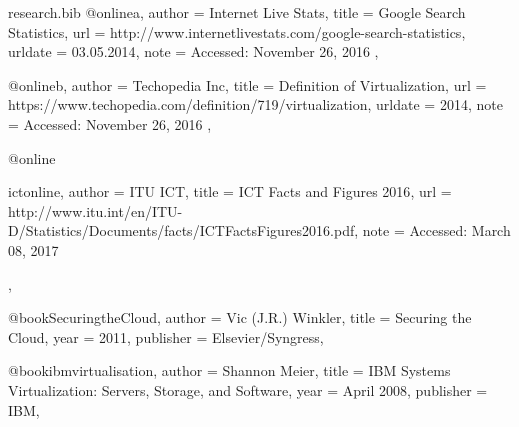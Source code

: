 \documentclass{article}
\begin{document}
	\begin{filecontents*}{research.bib}
		@online{a,
			author = {Internet Live Stats},
			title = {Google Search Statistics},
			url = {http://www.internetlivestats.com/google-search-statistics},
			urldate = {03.05.2014},
			note = {Accessed: November 26, 2016}
		},
	
		@online{b,
			author = {Techopedia Inc},
			title = {Definition of Virtualization},
			url = {https://www.techopedia.com/definition/719/virtualization},
			urldate = {2014},
			note = {Accessed: November 26, 2016}
		},
	
		@online{ictonline,
			author = {ITU ICT},
			title = {ICT Facts and Figures 2016},
			url = {http://www.itu.int/en/ITU-D/Statistics/Documents/facts/ICTFactsFigures2016.pdf},
			note = {Accessed: March 08, 2017}

		},
	
		@book{SecuringtheCloud,
			author    = {Vic (J.R.) Winkler},
			title     = {Securing the Cloud},
			year      = {2011},
			publisher = {Elsevier/Syngress},
		}
	
		@book{ibmvirtualisation,
			author    = {Shannon Meier},
			title     = {IBM Systems Virtualization: Servers, Storage, and Software},
			year      = {April 2008},
			publisher = {IBM},
		}

		
	\end{filecontents*}

	
\end{document}
